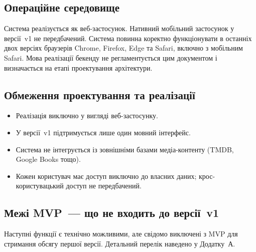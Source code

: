 \subsection{Операційне середовище}

Система реалізується як веб-застосунок. Нативний мобільний застосунок у версії~v1 не передбачений. Система повинна коректно функціонувати в останніх двох версіях браузерів Chrome, Firefox, Edge та Safari, включно з мобільним Safari. Мова реалізації бекенду не регламентується цим документом і визначається на етапі проектування архітектури. 

\subsection{Обмеження проектування та реалізації}

\begin{itemize}
  \item Реалізація виключно у вигляді веб-застосунку.
  \item У версії~v1 підтримується лише один мовний інтерфейс.
  \item Система не інтегрується із зовнішніми базами медіа-контенту (TMDB, Google Books тощо).
  \item Кожен користувач має доступ виключно до власних даних; крос-користувацький доступ не передбачений.
\end{itemize}

\subsection{Межі MVP~--- що не входить до версії~v1}

Наступні функції є технічно можливими, але свідомо виключені з MVP для стримання обсягу першої версії. Детальний перелік наведено у Додатку~А. 
